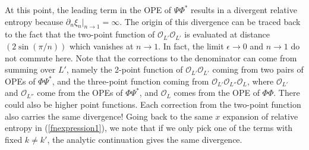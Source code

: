 \documentclass[11pt]{article}
\newcommand{\ep}{\epsilon}
\newcommand{\p}{\partial}
\newcommand{\mO}{\mathcal{O}}
\newcommand{\JM}[1]{\textcolor{orange}{#1}}
\begin{document}


At this point, the leading term in the OPE of $\Psi\Phi^*$ results in a divergent relative entropy because $\p_n\xi_n|_{n\to 1}=\infty$. The origin of this divergence can be traced back to the fact that the two-point function of $\mO_{L'}\mO_{L'}$ is evaluated at distance $(2\sin(\pi/n))$ which vanishes at $n\to 1$. In fact, the limit $\ep\to 0$ and $n\to 1$ do not commute here. Note that the corrections to the denominator can come from summing over $L'$, namely the 2-point function of $\mO_{L'}\mO_{L'}$ coming from two pairs of OPEs of $\Phi\Psi^*$, and the three-point function coming from $\mO_{L'}\mO_{L''}\mO_L$, where $\mO_{L'}$ and $\mO_{L''}$ come from the OPEs of $\Phi\Psi^*$, and $\mO_L$ comes from the OPE of $\Phi\Phi$. There could also be higher point functions. Each correction from the two-point function also carries the same divergence! Going back to the same $x$ expansion of relative entropy in (\ref{fnexpression1}), we note that if we only pick one of the terms with fixed $k\neq k'$, the analytic continuation gives the same divergence.
\end{document}
